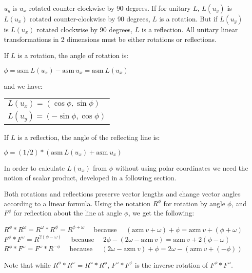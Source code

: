 \documentclass[12pt]{article}
\begin{document}
$u_y$ is $u_x$ rotated counter-clockwise by 90 degrees.
If for unitary $L$, $L(u_y)$ is $L(u_x)$ rotated counter-clockwise
by 90 degrees, $L$ is a rotation.
But if $L(u_y)$ is $L(u_x)$ rotated clockwise
by 90 degrees, $L$ is a reflection.  All unitary linear transformations
in 2 dimensions must be either rotations or reflections.

If $L$ is a rotation, the angle of rotation is: \\
\centerline{$\phi = \mathrm{asm}~L(u_x) - \mathrm{asm}~u_x =
             \mathrm{asm}~L(u_x)$}
and we have: \begin{tabular}[t]{l}
             $L(u_x)=(\cos\phi,\sin\phi)$ \\
             $L(u_y)=(-\sin\phi,\cos\phi)$ \\
	     \end{tabular}

If $L$ is a reflection, the angle of the reflecting line is: \\
\centerline{$\phi = (1/2)*(\mathrm{asm}~L(u_x) + \mathrm{asm}~u_x)$}
In order to calculate $L(u_x)$ from $\phi$ without using polar
coordinates we need the notion of scalar product, developed in a
following section.

Both rotations and reflections preserve vector lengths
and change vector angles according to a linear formula.
Using the notation $R^\phi$ for rotation by angle $\phi$,
and $F^\phi$ for reflection about the line at angle $\phi$,
we get the following:
\begin{center}
$R^\phi*R^\omega=R^\omega*R^\phi=R^{\phi+\omega}$
~~because~~
    $(\mathrm{azm}~v + \omega) + \phi = \mathrm{azm}~v + (\phi+\omega)$ \\
$F^\phi*F^\omega = R^{2(\phi-\omega)}$
~~because~~
    $2\phi - (2\omega - \mathrm{azm}~v) = \mathrm{azm}~v + 2(\phi-\omega)$ \\
$R^\phi*F^\omega = F^\omega*R^{-\phi}$
~~because~~
    $(2\omega - \mathrm{azm}~v) + \phi =
      2\omega - (\mathrm{azm}~v + (-\phi))$
\end{center}
Note that while $R^\phi*R^\omega=R^\omega*R^\phi$,
$F^\omega*F^\phi$ is the inverse rotation of $F^\phi*F^\omega$.

\bigskip
\end{document}
